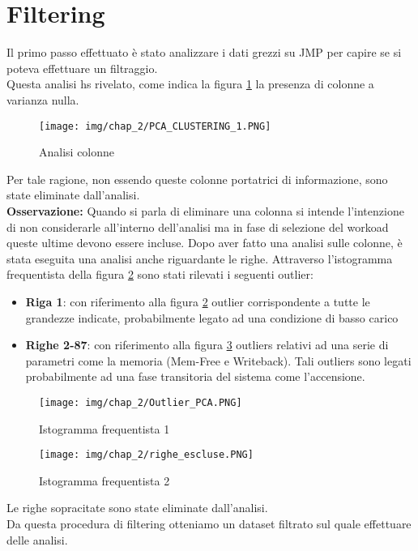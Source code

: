 \section{Filtering}
Il primo passo effettuato è stato analizzare i dati grezzi su JMP per capire se si poteva effettuare un filtraggio.\\
Questa analisi hs rivelato, come indica la figura \ref{fig:analisi_filtering} la presenza di colonne a varianza nulla.
\begin{figure}[H]
    \centering
    \texttt{[image: img/chap\_2/PCA\_CLUSTERING\_1.PNG]}
    \caption{Analisi colonne}
    \label{fig:analisi_filtering}
\end{figure}
\noindent
Per tale ragione, non essendo queste colonne portatrici di informazione, sono state eliminate dall'analisi.\\
\textbf{Osservazione:} Quando si parla di eliminare una colonna si intende l'intenzione di non considerarle all'interno dell'analisi ma in fase di selezione del workoad queste ultime devono essere incluse.
Dopo aver fatto una analisi sulle colonne, è stata eseguita una analisi anche riguardante le righe. 
Attraverso l'istogramma frequentista della figura \ref{fig:AnalisiRighe1} sono stati rilevati i seguenti outlier:
\begin{itemize}
    \item \textbf{Riga 1}: con riferimento alla figura \ref{fig:AnalisiRighe1} outlier corrispondente a tutte le grandezze indicate, probabilmente legato ad una condizione di basso carico
    \item \textbf{Righe 2-87}: con riferimento alla figura \ref{fig:AnalisiRighe2} outliers relativi ad una serie di parametri come la memoria (Mem-Free e Writeback). Tali outliers sono legati probabilmente ad una fase transitoria del sistema come l'accensione.
\end{itemize}
\begin{figure}[H]
    \centering
    \texttt{[image: img/chap\_2/Outlier\_PCA.PNG]}
    \caption{Istogramma frequentista 1}
    \label{fig:AnalisiRighe1}
\end{figure}
\begin{figure}[H]
    \centering
    \texttt{[image: img/chap\_2/righe\_escluse.PNG]}
    \caption{Istogramma frequentista 2}
    \label{fig:AnalisiRighe2}
\end{figure}
\noindent
Le righe sopracitate sono state eliminate dall'analisi.\\
Da questa procedura di filtering otteniamo un dataset filtrato sul quale effettuare delle analisi.
